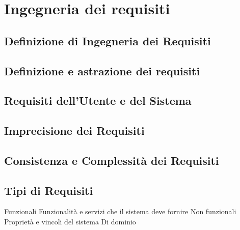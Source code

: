 \documentclass{article}
\begin{document}
	\section{Ingegneria dei requisiti}
	\subsection{Definizione di Ingegneria dei Requisiti}
	\subsection{Definizione e astrazione dei requisiti}
	\subsection{Requisiti dell’Utente e del Sistema}
	\subsection{Imprecisione dei Requisiti}
	\subsection{Consistenza e Complessità dei Requisiti}
	\subsection{Tipi di Requisiti}
	Funzionali
	Funzionalità e servizi che il sistema deve fornire
	Non funzionali
	Proprietà e vincoli del sistema
	Di dominio
\end{document}
